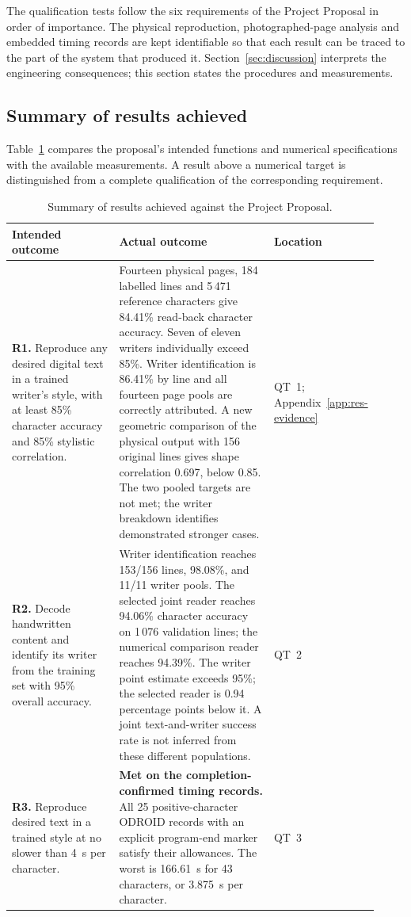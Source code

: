 \label{sec:results}
The qualification tests follow the six requirements of the Project Proposal in order of importance. The physical reproduction, photographed-page analysis and embedded timing records are kept identifiable so that each result can be traced to the part of the system that produced it. Section~\ref{sec:discussion} interprets the engineering consequences; this section states the procedures and measurements.

\subsection{Summary of results achieved}
\label{sec:res-summary}
Table~\ref{tab:res-summary} compares the proposal's intended functions and numerical specifications with the available measurements. A result above a numerical target is distinguished from a complete qualification of the corresponding requirement.

\begin{table}[!htbp]\centering\small
\setlength{\tabcolsep}{5pt}
\begin{tabular}{p{0.32\linewidth}p{0.48\linewidth}p{0.12\linewidth}}\toprule
\textbf{Intended outcome} & \textbf{Actual outcome} & \textbf{Location}\\\midrule
\textbf{R1.} Reproduce any desired digital text in a trained writer's style, with at least 85\% character accuracy and 85\% stylistic correlation. & Fourteen physical pages, 184 labelled lines and 5\,471 reference characters give 84.41\% read-back character accuracy. Seven of eleven writers individually exceed 85\%. Writer identification is 86.41\% by line and all fourteen page pools are correctly attributed. A new geometric comparison of the physical output with 156 original lines gives shape correlation 0.697, below 0.85. The two pooled targets are not met; the writer breakdown identifies demonstrated stronger cases. & QT~1; Appendix~\ref{app:res-evidence}\\[5pt]
\textbf{R2.} Decode handwritten content and identify its writer from the training set with 95\% overall accuracy. & Writer identification reaches 153/156 lines, 98.08\%, and 11/11 writer pools. The selected joint reader reaches 94.06\% character accuracy on 1\,076 validation lines; the numerical comparison reader reaches 94.39\%. The writer point estimate exceeds 95\%; the selected reader is 0.94 percentage points below it. A joint text-and-writer success rate is not inferred from these different populations. & QT~2\\[5pt]
\textbf{R3.} Reproduce desired text in a trained style at no slower than 4~s per character. & \textbf{Met on the completion-confirmed timing records.} All 25 positive-character ODROID records with an explicit program-end marker satisfy their allowances. The worst is 166.61~s for 43 characters, or 3.875~s per character. & QT~3\\[5pt]
\bottomrule\end{tabular}
\caption{Summary of results achieved against the Project Proposal.}\label{tab:res-summary}
\end{table}

